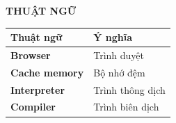 \documentclass[../DoAn.tex]{subfiles}
\begin{document}
\begin{center}
	\Large{\textbf{THUẬT NGỮ}}\\
\end{center}
\begin{longtable}{l p{12cm}}
	\hline
	\textbf{Thuật ngữ}    & \textbf{Ý nghĩa} \\ \hline
	\textbf{Browser}      & Trình duyệt      \\
	\textbf{Cache memory} & Bộ nhớ đệm       \\
	\textbf{Interpreter}  & Trình thông dịch \\
	\textbf{Compiler}     & Trình biên dịch  \\

	\hline
\end{longtable}
\end{document}
